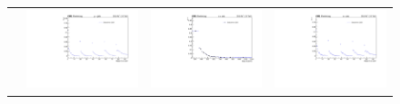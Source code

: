 \begin{figure}[htp]
\begin{tabular}{cccc}
& \hspace{-0.95cm} \includegraphics[scale=0.22]{fig/chapt7/qcd/qcd_mu_ch/ttbar_m_cos_data_drivenQCD.pdf}
& \hspace{-0.95cm} \includegraphics[scale=0.22]{fig/chapt7/qcd/qcd_e_ch/ttbar_m_data_drivenQCD.pdf}
& \hspace{-0.95cm} \includegraphics[scale=0.22]{fig/chapt7/qcd/qcd_e_ch/ttbar_m_cos_data_drivenQCD.pdf}\\

\end{tabular}
\end{figure}

